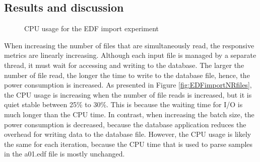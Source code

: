 \subsection{Results and discussion}
\begin{figure}
        \centering 
        \caption{CPU usage for the EDF import experiment}
        \label{fig:Figures/EDFIMPORT}
\end{figure}
When increasing the number of files that are simultaneously read, the responsive metrics are linearly increasing. Although each input file is managed by a separate thread, it must wait for accessing and writing to the database. The larger the number of file read, the longer the time to write to the database file, hence, the power consumption is increased. As presented in Figure \ref{fig:EDFimportNRfiles}, the CPU usage is increasing when the number of file reads is increased, but it is quiet stable between 25\% to 30\%. This is because the waiting time for I/O is much longer than the CPU time. In contrast, when increasing the batch size, the power consumption is decreased, because the database application reduces the overhead for writing data to the database file. However, the CPU usage is likely the same for each iteration, because the CPU time that is used to parse samples in the a01.edf file is mostly unchanged.\\
